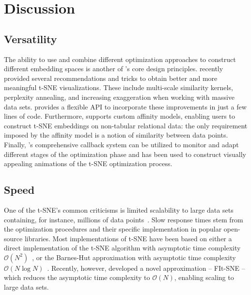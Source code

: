 \documentclass[article]{jss}
\newcommand{\opentsne}{\pkg{openTSNE}\xspace}
\begin{document}
\section{Discussion} \label{sec:discussion}

\subsection{Versatility}

The ability to use and combine different optimization approaches to construct different embedding spaces is another of \opentsne's core design principles. \citet{kobak2019art} recently provided several recommendations and tricks to obtain better and more meaningful t-SNE visualizations. These include multi-scale similarity kernels, perplexity annealing, and increasing exaggeration when working with massive data sets. \opentsne provides a flexible API to incorporate these improvements in just a few lines of code. Furthermore, \opentsne supports custom affinity models, enabling users to construct t-SNE embeddings on non-tabular relational data: the only requirement imposed by the affinity model is a notion of similarity between data points. Finally, \opentsne's comprehensive callback system can be utilized to monitor and adapt different stages of the optimization phase and has been used to construct visually appealing animations of the t-SNE optimization process.

\subsection{Speed}\label{s:speed}

One of the t-SNE's common criticisms is limited scalability to large data sets containing, for instance, millions of data points~\citep {becht2019dimensionality}. Slow response times stem from the optimization procedures and their specific implementation in popular open-source libraries. Most implementations of t-SNE have been based on either a direct implementation of the t-SNE algorithm with asymptotic time complexity $\mathcal{O}(N^2)$~\citep{maaten2008visualizing}, or the Barnes-Hut approximation with asymptotic time complexity $\mathcal{O}(N \log N)$~\citep{van2014accelerating}. Recently, however, \citet{linderman2019fast} developed a novel approximation -- FIt-SNE -- which reduces the asymptotic time complexity to $\mathcal {O}(N)$, enabling scaling to large data sets.
\end{document}

